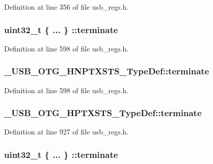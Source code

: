 Definition at line 356 of file usb\-\_\-regs.\-h.

\hypertarget{group___u_s_b___o_t_g___d_r_i_v_e_r_gaa45e1b3c37f90426f1727c0133681fc0}{
\subsubsection[{terminate}]{\setlength{\rightskip}{0pt plus 5cm}uint32\-\_\-t \{ ... \} \-::terminate}}\label{group___u_s_b___o_t_g___d_r_i_v_e_r_gaa45e1b3c37f90426f1727c0133681fc0}


Definition at line 598 of file usb\-\_\-regs.\-h.

\hypertarget{group___u_s_b___o_t_g___d_r_i_v_e_r_ga15d8c9921780fc2eabe7052d5aa94ca1}{
\subsubsection[{terminate}]{ \-\_\-\-U\-S\-B\-\_\-\-O\-T\-G\-\_\-\-H\-N\-P\-T\-X\-S\-T\-S\-\_\-\-Type\-Def\-::terminate}}\label{group___u_s_b___o_t_g___d_r_i_v_e_r_ga15d8c9921780fc2eabe7052d5aa94ca1}


Definition at line 598 of file usb\-\_\-regs.\-h.

\hypertarget{group___u_s_b___o_t_g___d_r_i_v_e_r_ga881f78bc7a8ff5748d6de34919c171eb}{
\subsubsection[{terminate}]{ \-\_\-\-U\-S\-B\-\_\-\-O\-T\-G\-\_\-\-H\-P\-T\-X\-S\-T\-S\-\_\-\-Type\-Def\-::terminate}}\label{group___u_s_b___o_t_g___d_r_i_v_e_r_ga881f78bc7a8ff5748d6de34919c171eb}


Definition at line 927 of file usb\-\_\-regs.\-h.

\hypertarget{group___u_s_b___o_t_g___d_r_i_v_e_r_ga1deba6084507bd22cde3bb19667bc2b0}{
\subsubsection[{terminate}]{\setlength{\rightskip}{0pt plus 5cm}uint32\-\_\-t \{ ... \} \-::terminate}}\label{group___u_s_b___o_t_g___d_r_i_v_e_r_ga1deba6084507bd22cde3bb19667bc2b0}


